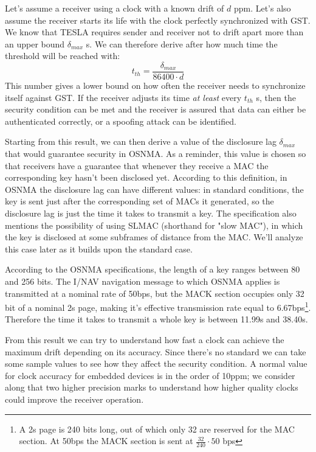 \vspace{\baselineskip}

Let's assume a receiver using a clock with a known drift of $d$ \si{ppm}. Let's
also assume the receiver starts its life with the clock perfectly synchronized
with GST. We know that TESLA requires sender and receiver not to drift apart
more than an upper bound $\delta_{max}$ \si{s}. We can therefore derive after how much
time the threshold will be reached with:
\begin{equation}
  t_{th} = \frac{\delta_{max}}{86400 \cdot d}
\end{equation}
This number gives a lower bound on how often the receiver needs to synchronize
itself against GST. If the receiver adjusts its time \textit{at least} every
$t_{th}$ \si{s}, then the security condition can be met and the receiver is
assured that data can either be authenticated correctly, or a spoofing attack
can be identified.

Starting from this result, we can then derive a value of the disclosure lag
$\delta_{max}$ that would guarantee security in OSNMA. As a reminder, this value
is chosen so that receivers have a guarantee that whenever they receive a MAC
the corresponding key hasn't been disclosed yet. According to this definition,
in OSNMA the disclosure lag can have different values: in standard conditions,
the key is sent just after the corresponding set of MACs it generated, so the
disclosure lag is just the time it takes to transmit a key. The specification
also mentions the possibility of using SLMAC (shorthand for "slow MAC"), in
which the key is disclosed at some subframes of distance from the MAC. We'll
analyze this case later as it builds upon the standard case.

\vspace{\baselineskip}

According to the OSNMA specifications, the length of a key ranges between 80 and
256 bits. The I/NAV navigation message to which OSNMA applies is
transmitted at a nominal rate of \num{50}\si{bps}, but the MACK section
occupies only 32 bit of a nominal \num{2}\si{s} page, making it's effective
transmission rate equal to \num{6.67}\si{bps}\footnote{A \num{2}\si{s} page is
240 bits long, out of which only 32 are reserved for the MAC section. At
\num{50}\si{bps} the MACK section is sent at $\frac{32}{240} \cdot 50$ bps}. Therefore
the time it takes to transmit a whole key is between \num{11.99}\si{s} and
\num{38.40}\si{s}.

From this result we can try to understand how fast a clock can achieve the
maximum drift depending on its accuracy. Since there's no standard we can take
some sample values to see how they affect the security condition. A normal value
for clock accuracy for embedded devices is in the order of \num{10}\si{ppm}; we
consider along that two higher precision marks to understand how higher quality
clocks could improve the receiver operation.

